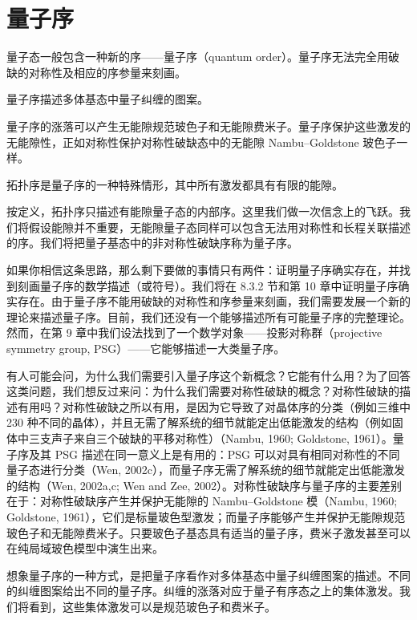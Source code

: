 \section{量子序}

\begin{keypoints}
\item 量子态一般包含一种新的序——量子序（quantum order）。量子序无法完全用破缺的对称性及相应的序参量来刻画。
\item 量子序描述多体基态中量子纠缠的图案。
\item 量子序的涨落可以产生无能隙规范玻色子和无能隙费米子。量子序保护这些激发的无能隙性，正如对称性保护对称性破缺态中的无能隙 Nambu--Goldstone 玻色子一样。
\item 拓扑序是量子序的一种特殊情形，其中所有激发都具有有限的能隙。
\end{keypoints}

按定义，拓扑序只描述有能隙量子态的内部序。这里我们做一次信念上的飞跃。我们将假设能隙并不重要，无能隙量子态同样可以包含无法用对称性和长程关联描述的序。我们将把量子基态中的非对称性破缺序称为量子序。

如果你相信这条思路，那么剩下要做的事情只有两件：证明量子序确实存在，并找到刻画量子序的数学描述（或符号）。我们将在 8.3.2 节和第 10 章中证明量子序确实存在。由于量子序不能用破缺的对称性和序参量来刻画，我们需要发展一个新的理论来描述量子序。目前，我们还没有一个能够描述所有可能量子序的完整理论。然而，在第 9 章中我们设法找到了一个数学对象——投影对称群（projective symmetry group, PSG）——它能够描述一大类量子序。

有人可能会问，为什么我们需要引入量子序这个新概念？它能有什么用？为了回答这类问题，我们想反过来问：为什么我们需要对称性破缺的概念？对称性破缺的描述有用吗？对称性破缺之所以有用，是因为它导致了对晶体序的分类（例如三维中 230 种不同的晶体），并且无需了解系统的细节就能定出低能激发的结构（例如固体中三支声子来自三个破缺的平移对称性）（Nambu, 1960; Goldstone, 1961）。量子序及其 PSG 描述在同一意义上是有用的：PSG 可以对具有相同对称性的不同量子态进行分类（Wen, 2002c），而量子序无需了解系统的细节就能定出低能激发的结构（Wen, 2002a,c; Wen and Zee, 2002）。对称性破缺序与量子序的主要差别在于：对称性破缺序产生并保护无能隙的 Nambu--Goldstone 模（Nambu, 1960; Goldstone, 1961），它们是标量玻色型激发；而量子序能够产生并保护无能隙规范玻色子和无能隙费米子。只要玻色子基态具有适当的量子序，费米子激发甚至可以在纯局域玻色模型中演生出来。

想象量子序的一种方式，是把量子序看作对多体基态中量子纠缠图案的描述。不同的纠缠图案给出不同的量子序。纠缠的涨落对应于量子有序态之上的集体激发。我们将看到，这些集体激发可以是规范玻色子和费米子。

